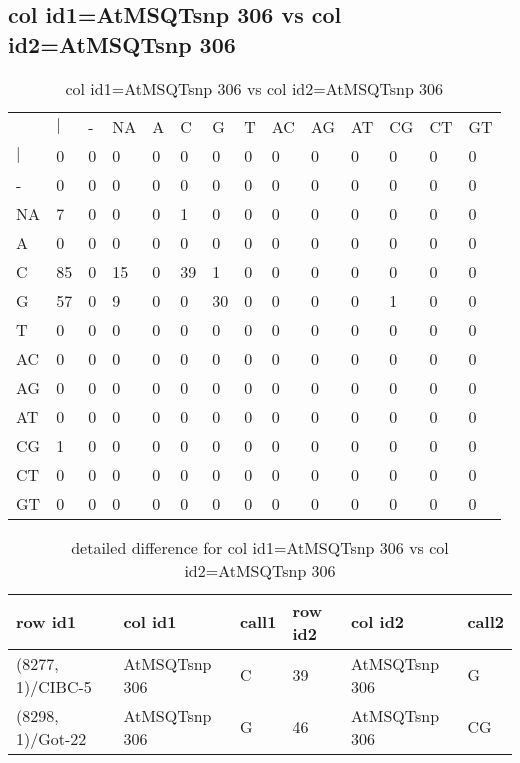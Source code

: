 \subsection{col id1=AtMSQTsnp 306 vs col id2=AtMSQTsnp 306}
\begin{center}
\begin{longtable}{|l|l|l|l|l|l|l|l|l|l|l|l|l|l|}
\caption{col id1=AtMSQTsnp 306 vs col id2=AtMSQTsnp 306} \label{table_dm650}\\
\hline
\\
\hline
&$|$&-&NA&A&C&G&T&AC&AG&AT&CG&CT&GT\\
$|$&0&0&0&0&0&0&0&0&0&0&0&0&0\\
-&0&0&0&0&0&0&0&0&0&0&0&0&0\\
NA&7&0&0&0&1&0&0&0&0&0&0&0&0\\
A&0&0&0&0&0&0&0&0&0&0&0&0&0\\
C&85&0&15&0&39&1&0&0&0&0&0&0&0\\
G&57&0&9&0&0&30&0&0&0&0&1&0&0\\
T&0&0&0&0&0&0&0&0&0&0&0&0&0\\
AC&0&0&0&0&0&0&0&0&0&0&0&0&0\\
AG&0&0&0&0&0&0&0&0&0&0&0&0&0\\
AT&0&0&0&0&0&0&0&0&0&0&0&0&0\\
CG&1&0&0&0&0&0&0&0&0&0&0&0&0\\
CT&0&0&0&0&0&0&0&0&0&0&0&0&0\\
GT&0&0&0&0&0&0&0&0&0&0&0&0&0\\
\hline
\end{longtable}
\end{center}

\begin{center}
\begin{longtable}{|l|l|l|l|l|l|}
\caption{detailed difference for col id1=AtMSQTsnp 306 vs col id2=AtMSQTsnp 306} \label{table_dm651}\\
\hline
row id1&col id1&call1&row id2&col id2&call2\\
\hline
(8277, 1)/CIBC-5&AtMSQTsnp 306&C&39&AtMSQTsnp 306&G\\
(8298, 1)/Got-22&AtMSQTsnp 306&G&46&AtMSQTsnp 306&CG\\
\hline
\end{longtable}
\end{center}

